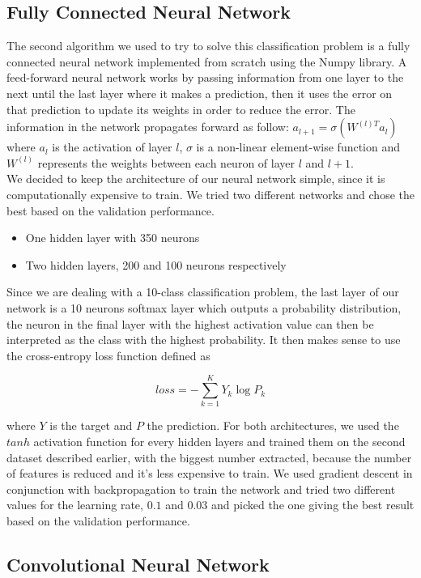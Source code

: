 \documentclass[letterpaper, 10 pt, conference]{ieeeconf}  %
\begin{document}
\subsection{Fully Connected Neural Network}
The second algorithm we used to try to solve this classification problem is a fully connected neural network implemented from scratch using the Numpy library. A feed-forward neural network works by passing information from one layer to the next until the last layer where it makes a prediction, then it uses the error on that prediction to update its weights in order to reduce the error. The information in the network propagates forward as follow: $a_{l+1} = \sigma (W^{(l)T}a_l)$ where $a_l$ is the activation of layer $l$, $\sigma$ is a non-linear element-wise function and $W^{(l)}$ represents the weights between each neuron of layer $l$ and $l+1$. \\
We decided to keep the architecture of our neural network simple, since it is computationally expensive to train. We tried two different networks and chose the best based on the validation performance.
\begin{itemize}
\item One hidden layer with 350 neurons
\item Two hidden layers, 200 and 100 neurons respectively
\end{itemize}
Since we are dealing with a 10-class classification problem, the last layer of our network is a 10 neurons softmax layer which outputs a probability distribution, the neuron in the final layer with the highest activation value can then be interpreted as the class with the highest probability. It then makes sense to use the cross-entropy loss function defined as
\begin{center}
$$loss = - \sum_{k=1}^{K}Y_k \log{P_k}$$
\end{center}
where $Y$ is the target and $P$ the prediction.
For both architectures, we used the $tanh$ activation function for every hidden layers and trained them on the second dataset described earlier, with the biggest number extracted, because the number of features is reduced and it's less expensive to train. We used gradient descent in conjunction with backpropagation to train the network and tried two different values for the learning rate, $0.1$ and $0.03$ and picked the one giving the best result based on the validation performance.


\subsection{Convolutional Neural Network}
\end{document}
